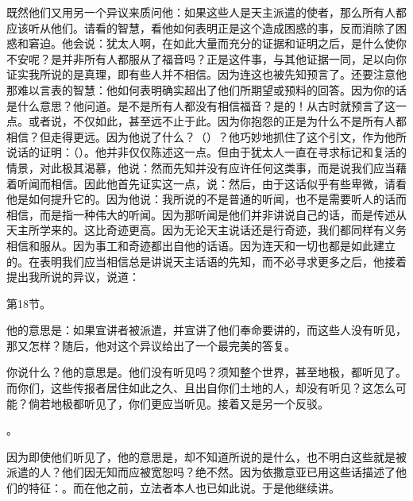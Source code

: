 既然他们又用另一个异议来质问他：如果这些人是天主派遣的使者，那么所有人都应该听从他们。请看的智慧，看他如何表明正是这个造成困惑的事，反而消除了困惑和窘迫。他会说：犹太人啊，在如此大量而充分的证据和证明之后，是什么使你不安呢？是并非所有人都服从了福音吗？正是这件事，与其他证据一同，足以向你证实我所说的是真理，即有些人并不相信。因为连这也被先知预言了。还要注意他那难以言表的智慧：他如何表明确实超出了他们所期望或预料的回答。因为你的话是什么意思？他问道。是不是所有人都没有相信福音？是的！从古时就预言了这一点。或者说，不仅如此，甚至远不止于此。因为你抱怨的正是为什么不是所有人都相信？但走得更远。因为他说了什么？（）？他巧妙地抓住了这个引文，作为他所说话的证明：（）。他并非仅仅陈述这一点。但由于犹太人一直在寻求标记和复活的情景，对此极其渴慕，他说：然而先知并没有应许任何这类事，而是说我们应当藉着听闻而相信。因此他首先证实这一点，说：然后，由于这话似乎有些卑微，请看他是如何提升它的。因为他说：我所说的不是普通的听闻，也不是需要听人的话而相信，而是指一种伟大的听闻。因为那听闻是他们并非讲说自己的话，而是传述从天主所学来的。这比奇迹更高。因为无论天主说话还是行奇迹，我们都同样有义务相信和服从。因为事工和奇迹都出自他的话语。因为连天和一切也都是如此建立的。在表明我们应当相信总是讲说天主话语的先知，而不必寻求更多之后，他接着提出我所说的异议，说道：\par

第18节。\par

他的意思是：如果宣讲者被派遣，并宣讲了他们奉命要讲的，而这些人没有听见，那又怎样？随后，他对这个异议给出了一个最完美的答复。\par

\par

你说什么？他的意思是。他们没有听见吗？须知整个世界，甚至地极，都听见了。而你们，这些传报者居住如此之久、且出自你们土地的人，却没有听见？这怎么可能？倘若地极都听见了，你们更应当听见。接着又是另一个反驳。\par

\newline{}。\par

因为即使他们听见了，他的意思是，却不知道所说的是什么，也不明白这些就是被派遣的人？他们因无知而应被宽恕吗？绝不然。因为依撒意亚已用这些话描述了他们的特征：\newline{}。而在他之前，立法者本人也已如此说。于是他继续讲。\par

